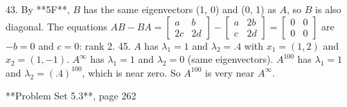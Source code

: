 43. By **5F**, \(B\) has the same eigenvectors (1, 0) and (0, 1) as \(A\), so \(B\) is also diagonal. The equations \(AB-BA=\begin{bmatrix}a&b\\ 2c&2d\end{bmatrix}-\begin{bmatrix}a&2b\\ c&2d\end{bmatrix}=\begin{bmatrix}0&0\\ 0&0\end{bmatrix}\) are \(-b=0\) and \(c=0\): rank 2.
45. \(A\) has \(\lambda_{1}=1\) and \(\lambda_{2}=.4\) with \(x_{1}=(1,2)\) and \(x_{2}=(1,-1)\). \(A^{\infty}\) has \(\lambda_{1}=1\) and \(\lambda_{2}=0\) (same eigenvectors). \(A^{100}\) has \(\lambda_{1}=1\) and \(\lambda_{2}=(.4)^{100}\), which is near zero. So \(A^{100}\) is very near \(A^{\infty}\).

**Problem Set 5.3**, page 262

